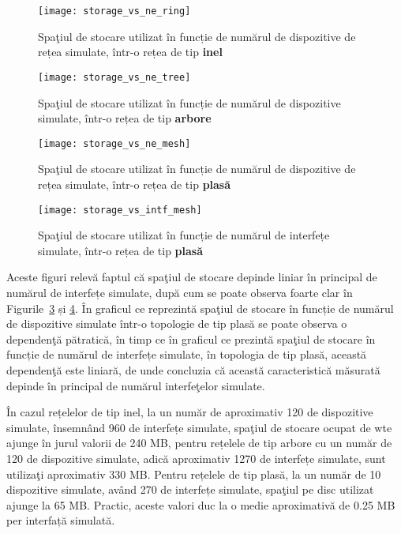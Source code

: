 \begin{figure}[hp]
	\centering
	\texttt{[image: storage\_vs\_ne\_ring]}
	\caption{Spaţiul de stocare utilizat în funcție de numărul de dispozitive de rețea simulate, într-o rețea de tip \textbf{inel}}
	\label{fig:storage_vs_ne_ring}
\end{figure}

\begin{figure}[hp]
	\centering
	\texttt{[image: storage\_vs\_ne\_tree]}
	\caption{Spaţiul de stocare utilizat în funcție de numărul de dispozitive simulate, într-o rețea de tip \textbf{arbore}}
	\label{fig:storage_vs_ne_tree}
\end{figure}

\begin{figure}[hp]
	\centering
	\texttt{[image: storage\_vs\_ne\_mesh]}
	\caption{Spaţiul de stocare utilizat în funcție de numărul de dispozitive de rețea simulate, într-o rețea de tip \textbf{plasă}}
	\label{fig:storage_vs_ne_mesh}
\end{figure}

\begin{figure}[hp]
	\centering
	\texttt{[image: storage\_vs\_intf\_mesh]}
	\caption{Spaţiul de stocare utilizat în funcție de numărul de interfețe simulate, într-o rețea de tip \textbf{plasă}}
	\label{fig:storage_vs_intf_mesh}
\end{figure}

Aceste figuri relevă faptul că spaţiul de stocare depinde liniar în principal de numărul de interfețe simulate, după cum se poate observa foarte clar în Figurile~\ref{fig:storage_vs_ne_mesh} și \ref{fig:storage_vs_intf_mesh}. În graficul ce reprezintă spaţiul de stocare în funcție de numărul de dispozitive simulate într-o topologie de tip plasă se poate observa o dependenţă pătratică, în timp ce în graficul ce prezintă spaţiul de stocare în funcție de numărul de interfețe simulate, în topologia de tip plasă, această dependenţă este liniară, de unde concluzia că această caracteristică măsurată depinde în principal de numărul interfeţelor simulate.

În cazul rețelelor de tip inel, la un număr de aproximativ 120 de dispozitive simulate, însemnând 960 de interfețe simulate, spaţiul de stocare ocupat de \gls{wte} ajunge în jurul valorii de 240 MB, pentru rețelele de tip arbore cu un număr de 120 de dispozitive simulate, adică aproximativ 1270 de interfețe simulate, sunt utilizaţi aproximativ 330 MB. Pentru rețelele de tip plasă, la un număr de 10 dispozitive simulate, având 270 de interfețe simulate, spaţiul pe disc utilizat ajunge la 65 MB. Practic, aceste valori duc la o medie aproximativă de 0.25 MB per interfață simulată.

